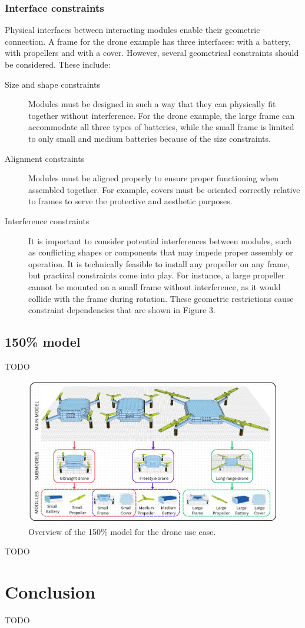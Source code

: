 \documentclass[sigconf,review]{acmart}
\begin{document}
\subsubsection{Interface constraints}

Physical interfaces between interacting modules enable their geometric connection. A frame for the drone example has three interfaces: with a battery, with propellers and with a cover. 
However, several geometrical constraints should be considered. These include:

\begin{description}
    \item[Size and shape constraints] Modules must be designed in such a way that they can physically fit together without interference. 
For the drone example, the large frame can accommodate all three types of batteries, while the small frame is limited to only small and medium batteries because of the size constraints.
    \item[Alignment constraints] Modules must be aligned properly to ensure proper functioning when assembled together. 
For example, covers must be oriented correctly relative to frames to serve the protective and aesthetic purposes. 
    \item[Interference constraints] It is important to consider potential interferences between modules, such as conflicting shapes or components that may impede proper assembly or operation. 
It is technically feasible to install any propeller on any frame, but practical constraints come into play. For instance, a large propeller cannot be mounted on a small frame without interference, as it would collide with the frame during rotation.
These geometric restrictions cause constraint dependencies that are shown in Figure 3.
\end{description}

\subsection{150\% model}
\label{sec:150-model}

TODO

\begin{figure}[htbp]
    \includegraphics[width=\textwidth]{./150_MODEL_3.jpg}
    \caption{Overview of the 150\% model for the drone use case.}
    \label{fig:150-model}
\end{figure}

TODO

\section{Conclusion}
\label{sec:conclusion}

TODO



\end{document}
